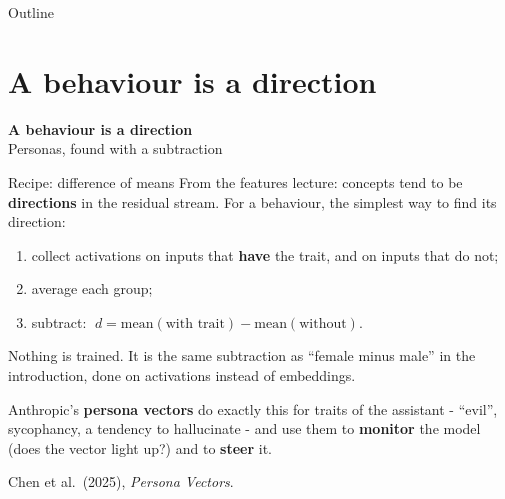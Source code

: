 \documentclass[aspectratio=169]{beamer}
\newcommand{\keybox}[1]{%
  \begin{tcolorbox}[colback=armblue!8, colframe=armblue, boxrule=0.6pt, arc=2pt]
  #1
  \end{tcolorbox}}
\newcommand{\sectiontransition}[2]{%
  \begin{frame}[plain]
    \vfill
    \begin{center}
      {\Huge\bfseries\color{popblue} #1}\\[1.1em]
      {\large #2}
    \end{center}
    \vfill
  \end{frame}}
\begin{document}
\begin{frame}{Outline}
  \tableofcontents
\end{frame}

\section{A behaviour is a direction}
\sectiontransition{A behaviour is a direction}{Personas, found with a subtraction}

\begin{frame}{Recipe: difference of means}
  \vspace{0.4em}
  From the features lecture: concepts tend to be \textbf{directions} in the residual stream. For a
  behaviour, the simplest way to find its direction:

  \vspace{0.4em}
  \begin{enumerate}
    \item collect activations on inputs that \textbf{have} the trait, and on inputs that do not;
    \item average each group;
    \item subtract: $\;d = \text{mean}(\text{with trait}) - \text{mean}(\text{without})$.
  \end{enumerate}

  \vspace{0.5em}
  \keybox{\small Nothing is trained. It is the same subtraction as ``female minus male'' in the
  introduction, done on activations instead of embeddings.}

  \vspace{0.3em}
  Anthropic's \textbf{persona vectors} do exactly this for traits of the assistant - ``evil'',
  sycophancy, a tendency to hallucinate - and use them to \textbf{monitor} the model (does the
  vector light up?) and to \textbf{steer} it.

  \vspace{0.2em}
  {\footnotesize Chen et al.\ (2025), \emph{Persona Vectors}.}
\end{frame}
\end{document}
